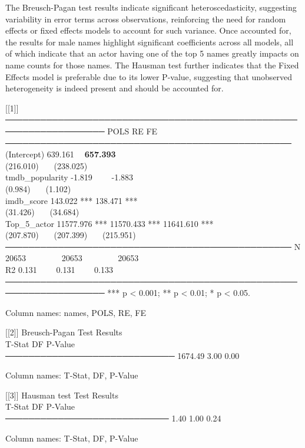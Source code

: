\documentclass[11pt,preprint, authoryear]{elsarticle}
\numberwithin{equation}{section}
\numberwithin{figure}{section}
\numberwithin{table}{section}
\begin{document}
\hfill

The Breusch-Pagan test results indicate significant heteroscedasticity,
suggesting variability in error terms across observations, reinforcing
the need for random effects or fixed effects models to account for such
variance. Once accounted for, the results for male names highlight
significant coefficients across all models, all of which indicate that
an actor having one of the top 5 names greatly impacts on name counts
for those names. The Hausman test further indicates that the Fixed
Effects model is preferable due to its lower P-value, suggesting that
unobserved heterogeneity is indeed present and should be accounted for.

{[}{[}1{]}{]}
─────────────────────────────────────────────────────────────────── POLS
RE FE\\
───────────────────────────────────────────────── (Intercept) 639.161
\textbf{~ 657.393 }~ ~~~~~~~~\\
(216.010)~~~ (238.025)~~~ ~~~~~~~~\\
tmdb\_popularity -1.819~~~~ -1.883~~~~ ~~~~~~~~\\
(0.984)~~~ (1.102)~~~ ~~~~~~~~\\
imdb\_score 143.022 *** 138.471 *** ~~~~~~~~\\
(31.426)~~~ (34.684)~~~ ~~~~~~~~\\
Top\_5\_actor 11577.976 *** 11570.433 *** 11641.610 ***\\
(207.870)~~~ (207.399)~~~ (215.951)~~~\\
───────────────────────────────────────────────── N 20653~~~~~~~~
20653~~~~~~~~ 20653~~~~~~~~\\
R2 0.131~~~~ 0.131~~~~ 0.133~~~~\\
─────────────────────────────────────────────────────────────────── ***
p \textless{} 0.001; ** p \textless{} 0.01; * p \textless{} 0.05.

Column names: names, POLS, RE, FE

{[}{[}2{]}{]} Breusch-Pagan Test Results\\
T-Stat DF P-Value\\
───────────────────────────── 1674.49 3.00 0.00

Column names: T-Stat, DF, P-Value

{[}{[}3{]}{]} Hausman test Test Results\\
T-Stat DF P-Value\\
──────────────────────────── 1.40 1.00 0.24

Column names: T-Stat, DF, P-Value
\end{document}
